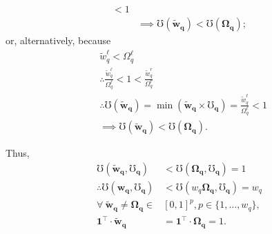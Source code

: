 \documentclass[hidelinks, nonatbib]{elsarticle}
\begin{document}
\begin{enumerate}
\begin{align}
{        }
        < 
        1
        \\
        &\implies
        \mho(\boldsymbol{\tilde{w}_q})
        <
        \mho(\boldsymbol{\Omega_q})
        ;
    \end{align}
    or, alternatively, because
    \begin{align}
        &
        \tilde{w}_{q}^{\ell} < \Omega_{q}^{\ell}
        \\
        &\therefore
        \frac{
            \tilde{w}_{q}^{\ell}
        }{
            \Omega_{q}^{\ell}
        }
        < 
        1
        < 
        \frac{
            \tilde{w}_{q}^{r}
        }{
            \Omega_{q}^{r}
        }
        \\
        &\therefore
        \mho(\boldsymbol{\tilde{w}_q})
        = 
        \min(
            \boldsymbol{\tilde{w}_q}
            \times
            \boldsymbol{\mho_q}
        )
        =
        \frac{
            \tilde{w}_{q}^{\ell}
        }{
            \Omega_{q}^{\ell}
        }
        < 
        1
        \\
        &\implies
        \mho(\boldsymbol{\tilde{w}_q})
        <
        \mho(\boldsymbol{\Omega_q})
        .
    \end{align}

    Thus, 
    \begin{align}
        \mho(
            \boldsymbol{\tilde{w}_{q}},
            \boldsymbol{\mho_q}
        ) 
        &< 
        \mho(
            \boldsymbol{\Omega_{q}},
            \boldsymbol{\mho_q}
        ) 
        = 1
        \\
        \therefore
        \mho(
            \boldsymbol{w_{q}},
            \boldsymbol{\mho_q}
        )
        &< 
        \mho(
            w_{q}
            \boldsymbol{\Omega_{q}},
            \boldsymbol{\mho_q}
        ) 
        = w_q
        \\
        \forall
        \
        \boldsymbol{\tilde{w}_{q}}
        \neq
        \boldsymbol{\Omega_{q}}
        \in
        &
        [0,1]^{p}
        ,
        p \in \{1, \dots, w_q\}
        ,
        \\
        \boldsymbol{1} ^ {\top}
        \cdot
        \boldsymbol{\tilde{w}_{q}}
        &=
        \boldsymbol{1} ^ {\top}
        \cdot
        \boldsymbol{\Omega_{q}}
        = 1
        .
    \end{align}


\end{enumerate}
\end{document}
